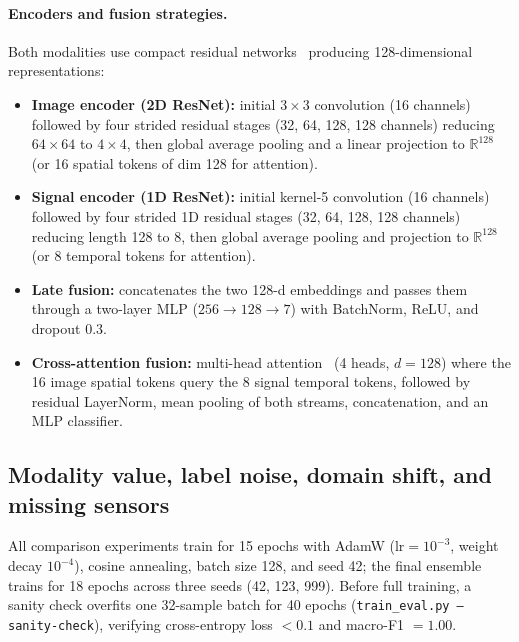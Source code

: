 \paragraph{Encoders and fusion strategies.} Both modalities use compact residual
networks~\cite{he2016} producing 128-dimensional representations:
\begin{itemize}
  \item \textbf{Image encoder (2D ResNet):} initial $3\times 3$ convolution (16 channels) followed by
  four strided residual stages (32, 64, 128, 128 channels) reducing $64\times 64$ to $4\times 4$, then
  global average pooling and a linear projection to $\mathbb{R}^{128}$ (or 16 spatial tokens of dim
  128 for attention).
  \item \textbf{Signal encoder (1D ResNet):} initial kernel-5 convolution (16 channels) followed by
  four strided 1D residual stages (32, 64, 128, 128 channels) reducing length 128 to 8, then global
  average pooling and projection to $\mathbb{R}^{128}$ (or 8 temporal tokens for attention).
  \item \textbf{Late fusion:} concatenates the two 128-d embeddings and passes them through a
  two-layer MLP ($256 \to 128 \to 7$) with BatchNorm, ReLU, and dropout $0.3$.
  \item \textbf{Cross-attention fusion:} multi-head attention~\cite{vaswani2017} (4 heads,
  $d=128$) where the 16 image spatial tokens query the 8 signal temporal tokens, followed by residual
  LayerNorm, mean pooling of both streams, concatenation, and an MLP classifier.
\end{itemize}

\subsection{Modality value, label noise, domain shift, and missing sensors}
\label{sec:t1-experiments}

All comparison experiments train for 15 epochs with AdamW ($\text{lr}=10^{-3}$, weight decay
$10^{-4}$), cosine annealing, batch size 128, and seed 42; the final ensemble trains for 18 epochs
across three seeds (42, 123, 999). Before full training, a sanity check overfits one 32-sample batch
for 40 epochs (\texttt{train\_eval.py --sanity-check}), verifying cross-entropy loss $< 0.1$ and
macro-F1 $= 1.00$.

